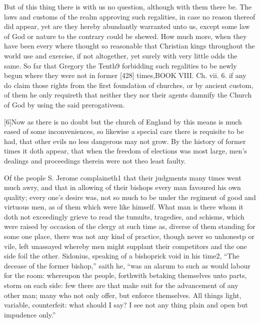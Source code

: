 But of this thing there is with us no question, although with them there be. The laws and customs of the realm approving such regalities, in case no reason thereof did appear, yet are they hereby abundantly warranted unto us, except some law of God or nature to the contrary could be shewed. How much more, when they have been every where thought so reasonable that Christian kings throughout the world use and exercise, if not altogether, yet surely with very little odds the same. So far that Gregory the Tenth9 forbidding such regalities to be newly begun where they were not in former [428] times,BOOK VIII. Ch. vii. 6. if any do claim those rights from the first foundation of churches, or by ancient custom, of them he only requireth that neither they nor their agents damnify the Church of God by using the said prerogativesn.

[6]Now as there is no doubt but the church of England by this means is much eased of some inconveniences, so likewise a special care there is requisite to be had, that other evils no less dangerous may not grow. By the history of former times it doth appear, that when the freedom of elections was most large, men’s dealings and proceedings therein were not theo least faulty.

Of the people S. Jerome complaineth1 that their judgments many times went much awry, and that in allowing of their bishops every man favoured his own quality; every one’s desire was, not so much to be under the regiment of good and virtuous men, as of them which were like himself. What man is there whom it doth not exceedingly grieve to read the tumults, tragedies, and schisms, which were raised by occasion of the clergy at such time as, diverse of them standing for some one place, there was not any kind of practice, though never so unhonestp or vile, left unassayed whereby men might supplant their competitors and the one side foil the other. Sidonius, speaking of a bishoprick void in his time2, “The decease of the former bishop,” saith he, “was an alarum to such as would labour for the room: whereupon the people, forthwith betaking themselves unto parts, storm on each side: few there are that make suit for the advancement of any other man; many who not only offer, but enforce themselves. All things light, variable, counterfeit: what should I say? I see not any thing plain and open but impudence only.”

